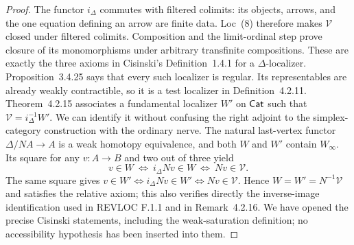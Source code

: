 \begin{proof}
The functor $i_\Delta$ commutes with filtered colimits: its objects,
arrows, and the one equation defining an arrow are finite data.
Loc~(8) therefore makes $\mathcal V$ closed under filtered colimits.
Composition and the limit-ordinal step prove closure of its
monomorphisms under arbitrary transfinite compositions.  These are
exactly the three axioms in Cisinski's Definition~1.4.1 for a
$\Delta$-localizer.  Proposition~3.4.25 says that every such
localizer is regular.  Its representables are already weakly
contractible, so it is a test localizer in Definition~4.2.11.
Theorem~4.2.15 associates a fundamental localizer $W'$ on $\mathsf{Cat}$
such that $\mathcal V=i_\Delta^{-1}W'$.  We can identify it without
confusing the right adjoint to the simplex-category construction with
the ordinary nerve.  The natural last-vertex functor
$\Delta/NA\to A$ is a weak homotopy equivalence, and both $W$ and
$W'$ contain $W_\infty$.  Its square for any $v:A\to B$ and two out
of three yield
\[
 v\in W\ \Longleftrightarrow\ i_\Delta Nv\in W
 \ \Longleftrightarrow\ Nv\in\mathcal V.
\]
The same square gives
$v\in W'\Longleftrightarrow i_\Delta Nv\in W'
\Longleftrightarrow Nv\in\mathcal V$.
Hence $W=W'=N^{-1}\mathcal V$ and satisfies the relative axiom;
this also verifies directly the inverse-image identification used in
REVLOC F.1.1 and in Remark~4.2.16.
We have opened the precise Cisinski statements, including the
weak-saturation definition; no accessibility hypothesis has been
inserted into them.
\end{proof}

